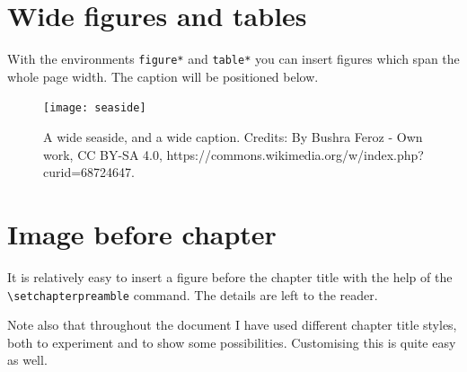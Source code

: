 \section{Wide figures and tables}

With the environments \verb|figure*| and \verb|table*| you can insert 
figures which span the whole page width. The caption will be positioned 
below.

\begin{figure}
	\texttt{[image: seaside]}
	\caption[A wide seaside]{A wide seaside, and a wide caption.
		Credits: By Bushra Feroz - Own work, CC BY-SA 4.0, 
		https://commons.wikimedia.org/w/index.php?curid=68724647.
		\blindtext}
\end{figure}

\section{Image before chapter}

It is relatively easy to insert a figure before the chapter title with 
the help of the \verb|\setchapterpreamble| command. The details are left 
to the reader.

Note also that throughout the document I have used different chapter 
title styles, both to experiment and to show some possibilities. 
Customising this is quite easy as well.
